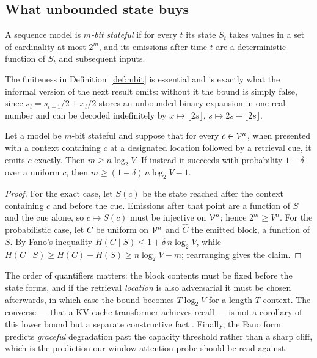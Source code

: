 \subsection{What unbounded state buys}

\begin{definition}
\label{def:mbit}
A sequence model is \emph{$m$-bit stateful} if for every $t$ its state $S_t$
takes values in a set of cardinality at most $2^{m}$, and its emissions after
time $t$ are a deterministic function of $S_t$ and subsequent inputs.
\end{definition}

The finiteness in Definition~\ref{def:mbit} is essential and is exactly what the
informal version of the next result omits: without it the bound is simply false,
since $s_t = s_{t-1}/2 + x_t/2$ stores an unbounded binary expansion in one real
number and can be decoded indefinitely by $x \mapsto \lfloor 2s\rfloor$,
$s \mapsto 2s - \lfloor 2s \rfloor$.

\begin{theorem}
\label{thm:recall}
Let a model be $m$-bit stateful and suppose that for every
$c \in \mathcal{V}^{n}$, when presented with a context containing $c$ at a designated
location followed by a retrieval cue, it emits $c$ exactly. Then
$m \ge n\log_2 V$. If instead it succeeds with probability $1-\delta$ over a
uniform $c$, then $m \ge (1-\delta)\,n\log_2 V - 1$.
\end{theorem}

\begin{proof}
For the exact case, let $S(c)$ be the state reached after the context containing
$c$ and before the cue. Emissions after that point are a function of $S$ and the
cue alone, so $c \mapsto S(c)$ must be injective on $\mathcal{V}^n$; hence
$2^{m} \ge V^{n}$. For the probabilistic case, let $C$ be uniform on $\mathcal{V}^n$
and $\hat C$ the emitted block, a function of $S$. By Fano's inequality
$H(C \mid S) \le 1 + \delta\, n\log_2 V$, while
$H(C\mid S) \ge H(C) - H(S) \ge n\log_2 V - m$; rearranging gives the claim.
\end{proof}

\begin{remark}
The order of quantifiers matters: the block contents must be fixed before the
state forms, and if the retrieval \emph{location} is also adversarial it must be
chosen afterwards, in which case the bound becomes $T\log_2 V$ for a
length-$T$ context. The converse --- that a KV-cache transformer achieves recall
--- is not a corollary of this lower bound but a separate constructive fact
\cite{jelassi2024,arora2023zoology}. Finally, the Fano form predicts
\emph{graceful} degradation past the capacity threshold rather than a sharp
cliff, which is the prediction our window-attention probe should be read against.
\end{remark}
